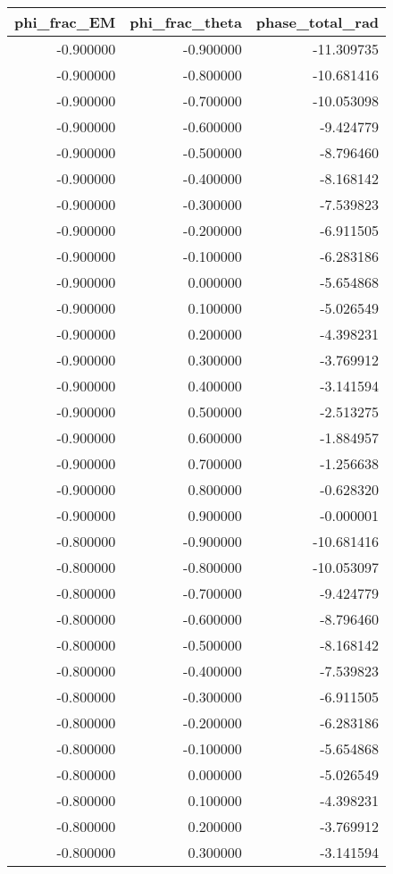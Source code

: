 \begin{tabular}{rrr}
\toprule
phi_frac_EM & phi_frac_theta & phase_total_rad \\
\midrule
-0.900000 & -0.900000 & -11.309735 \\
-0.900000 & -0.800000 & -10.681416 \\
-0.900000 & -0.700000 & -10.053098 \\
-0.900000 & -0.600000 & -9.424779 \\
-0.900000 & -0.500000 & -8.796460 \\
-0.900000 & -0.400000 & -8.168142 \\
-0.900000 & -0.300000 & -7.539823 \\
-0.900000 & -0.200000 & -6.911505 \\
-0.900000 & -0.100000 & -6.283186 \\
-0.900000 & 0.000000 & -5.654868 \\
-0.900000 & 0.100000 & -5.026549 \\
-0.900000 & 0.200000 & -4.398231 \\
-0.900000 & 0.300000 & -3.769912 \\
-0.900000 & 0.400000 & -3.141594 \\
-0.900000 & 0.500000 & -2.513275 \\
-0.900000 & 0.600000 & -1.884957 \\
-0.900000 & 0.700000 & -1.256638 \\
-0.900000 & 0.800000 & -0.628320 \\
-0.900000 & 0.900000 & -0.000001 \\
-0.800000 & -0.900000 & -10.681416 \\
-0.800000 & -0.800000 & -10.053097 \\
-0.800000 & -0.700000 & -9.424779 \\
-0.800000 & -0.600000 & -8.796460 \\
-0.800000 & -0.500000 & -8.168142 \\
-0.800000 & -0.400000 & -7.539823 \\
-0.800000 & -0.300000 & -6.911505 \\
-0.800000 & -0.200000 & -6.283186 \\
-0.800000 & -0.100000 & -5.654868 \\
-0.800000 & 0.000000 & -5.026549 \\
-0.800000 & 0.100000 & -4.398231 \\
-0.800000 & 0.200000 & -3.769912 \\
-0.800000 & 0.300000 & -3.141594 \\

\end{tabular}
